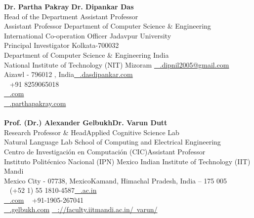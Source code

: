 \textbf{Dr. Partha Pakray} \hfill \textbf{Dr. Dipankar Das}\\
Head of the Department \hfill Assistant Professor\\
Assistant Professor \hfill Department of Computer Science \& Engineering\\
International Co-operation Officer \hfill Jadavpur University\\
Principal Investigator \hfill Kolkata-700032\\
Department of Computer Science \& Engineering \hfill India\\
National Institute of Technology (NIT) Mizoram \hfill \href{mailto:\@email}{\faEnvelope\ \hspace{2mm} \@dipankar.dipnil2005@gmail.com\\}
Aizawl - 796012 , India\hfill \href{http://\@homepage}{\faHome\ \hspace{2mm} \@www.dasdipankar.com\\}
\faMobile\ \hspace{1mm} \@+91 8259065018 \\
\href{mailto:\@email}{\faEnvelope\ \hspace{2mm} \@parthapakray@gmail.com\\}
\href{http://\@homepage}{\faHome\ \hspace{2mm} \@www.parthapakray.com\\}\\
\textbf{Prof. (Dr.) Alexander Gelbukh}\hfill \textbf{Dr. Varun Dutt}\\
Research Professor \& Head\hfill Applied Cognitive Science Lab\\
Natural Language Lab \hfill School of Computing and Electrical Engineering\\
Centro de Investigación en Computación (CIC)\hfill Assistant Professor\\ Instituto Politécnico Nacional (IPN) Mexico\hfill 
Indian Institute of Technology (IIT) Mandi\\
Mexico City - 07738, Mexico\hfill Kamand, Himachal Pradesh, India – 175 005\\
\faMobile\ \hspace{1mm} \@(+52 1) 55 1810-4587\hfill \href{mailto:\@email}{\faEnvelope\ \hspace{1mm} \@varun@iitmandi.ac.in\\}
\href{mailto:\@email}{\faEnvelope\ \hspace{1mm} \@gelbukh@gelbukh.com} \hfill \faMobile\ \hspace{1mm} \@+91-1905-267041\\
\href{http://\@homepage}{\faHome\ \hspace{2mm} \@www.gelbukh.com} \hfill \href{http://\@homepage}{\faHome\ \hspace{2mm} \@http://faculty.iitmandi.ac.in/~varun/}
